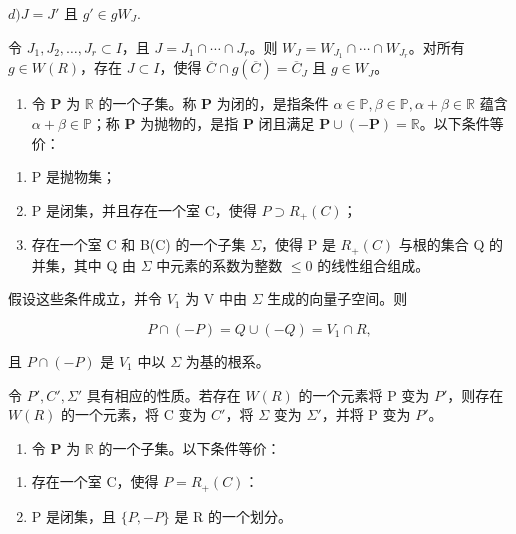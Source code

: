 \(d) J = J' \text{ 且 } g' \in gW_J.\)

令 \(J_1, J_2, \ldots, J_r \subset I\)，且 \(J = J_1 \cap \cdots \cap J_r\)。则 \(W_J = W_{J_1} \cap \cdots \cap W_{J_r}\)。对所有 \(g \in W(R)\)，存在 \(J \subset I\)，使得 \(\overline{C} \cap g(\overline{C}) = \overline{C}_J\) 且 \(g \in W_J\)。

\begin{enumerate}
\def\labelenumi{\arabic{enumi})}
\setcounter{enumi}{19}
\tightlist
\item
  令 \(\mathbf{P}\) 为 \(\mathbb{R}\) 的一个子集。称 \(\mathbf{P}\) 为闭的，是指条件 \(\alpha \in \mathbb{P}, \beta \in \mathbb{P}, \alpha + \beta \in \mathbb{R}\) 蕴含 \(\alpha + \beta \in \mathbb{P}\)；称 \(\mathbf{P}\) 为抛物的，是指 \(\mathbf{P}\) 闭且满足 \(\mathbf{P} \cup (-\mathbf{P}) = \mathbb{R}\)。以下条件等价：
\end{enumerate}

\begin{enumerate}
\def\labelenumi{\alph{enumi})}
\item
  P 是抛物集；
\item
  P 是闭集，并且存在一个室 C，使得 \(P \supset R_{+}(C)\)；
\item
  存在一个室 C 和 B(C) 的一个子集 \(\Sigma\)，使得 P 是 \(R_{+}(C)\) 与根的集合 Q 的并集，其中 Q 由 \(\Sigma\) 中元素的系数为整数 \(\leqslant 0\) 的线性组合组成。
\end{enumerate}

假设这些条件成立，并令 \(V_{1}\) 为 V 中由 \(\Sigma\) 生成的向量子空间。则

\[
P \cap (- P) = Q \cup (- Q) = V _ {1} \cap R,
\]

且 \(P \cap (-P)\) 是 \(V_1\) 中以 \(\Sigma\) 为基的根系。

令 \(P', C', \Sigma'\) 具有相应的性质。若存在 \(W(R)\) 的一个元素将 P 变为 \(P'\)，则存在 \(W(R)\) 的一个元素，将 C 变为 \(C'\)，将 \(\Sigma\) 变为 \(\Sigma'\)，并将 P 变为 \(P'\)。

\begin{enumerate}
\def\labelenumi{\arabic{enumi})}
\setcounter{enumi}{20}
\tightlist
\item
  令 \(\mathbf{P}\) 为 \(\mathbb{R}\) 的一个子集。以下条件等价：
\end{enumerate}

\begin{enumerate}
\def\labelenumi{\alph{enumi})}
\item
  存在一个室 C，使得 \(P = R_{+}(C)\)：
\item
  P 是闭集，且 \(\{P, -P\}\) 是 R 的一个划分。
\end{enumerate}

